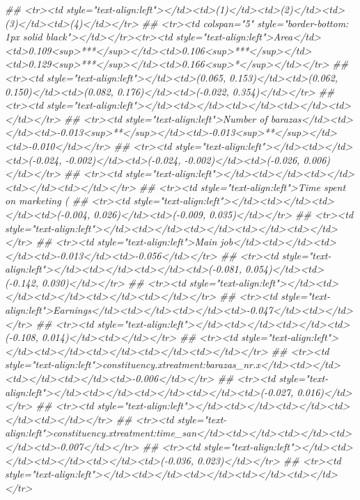\documentclass[
]{article}
\newenvironment{Shaded}{\begin{snugshade}}{\end{snugshade}}
\newcommand{\CommentTok}[1]{\textcolor[rgb]{0.56,0.35,0.01}{\textit{#1}}}
\begin{document}
\begin{Shaded}
\begin{Highlighting}[]
{{{{{{{{{{{{{{{{{\CommentTok{## <tr><td style="text-align:left"></td><td>(1)</td><td>(2)</td><td>(3)</td><td>(4)</td></tr>}
\CommentTok{## <tr><td colspan="5" style="border-bottom: 1px solid black"></td></tr><tr><td style="text-align:left">Area</td><td>0.109<sup>***</sup></td><td>0.106<sup>***</sup></td><td>0.129<sup>***</sup></td><td>0.166<sup>*</sup></td></tr>}
\CommentTok{## <tr><td style="text-align:left"></td><td>(0.065, 0.153)</td><td>(0.062, 0.150)</td><td>(0.082, 0.176)</td><td>(-0.022, 0.354)</td></tr>}
\CommentTok{## <tr><td style="text-align:left"></td><td></td><td></td><td></td><td></td></tr>}
\CommentTok{## <tr><td style="text-align:left">Number of barazas</td><td></td><td>-0.013<sup>**</sup></td><td>-0.013<sup>**</sup></td><td>-0.010</td></tr>}
\CommentTok{## <tr><td style="text-align:left"></td><td></td><td>(-0.024, -0.002)</td><td>(-0.024, -0.002)</td><td>(-0.026, 0.006)</td></tr>}
\CommentTok{## <tr><td style="text-align:left"></td><td></td><td></td><td></td><td></td></tr>}
\CommentTok{## <tr><td style="text-align:left">Time spent on marketing (%)</td><td></td><td></td><td>0.011</td><td>0.013</td></tr>}
\CommentTok{## <tr><td style="text-align:left"></td><td></td><td></td><td>(-0.004, 0.026)</td><td>(-0.009, 0.035)</td></tr>}
\CommentTok{## <tr><td style="text-align:left"></td><td></td><td></td><td></td><td></td></tr>}
\CommentTok{## <tr><td style="text-align:left">Main job</td><td></td><td></td><td>-0.013</td><td>-0.056</td></tr>}
\CommentTok{## <tr><td style="text-align:left"></td><td></td><td></td><td>(-0.081, 0.054)</td><td>(-0.142, 0.030)</td></tr>}
\CommentTok{## <tr><td style="text-align:left"></td><td></td><td></td><td></td><td></td></tr>}
\CommentTok{## <tr><td style="text-align:left">Earnings</td><td></td><td></td><td>-0.047</td><td></td></tr>}
\CommentTok{## <tr><td style="text-align:left"></td><td></td><td></td><td>(-0.108, 0.014)</td><td></td></tr>}
\CommentTok{## <tr><td style="text-align:left"></td><td></td><td></td><td></td><td></td></tr>}
\CommentTok{## <tr><td style="text-align:left">constituency.xtreatment:barazas_nr.x</td><td></td><td></td><td></td><td>-0.006</td></tr>}
\CommentTok{## <tr><td style="text-align:left"></td><td></td><td></td><td></td><td>(-0.027, 0.016)</td></tr>}
\CommentTok{## <tr><td style="text-align:left"></td><td></td><td></td><td></td><td></td></tr>}
\CommentTok{## <tr><td style="text-align:left">constituency.xtreatment:time_san</td><td></td><td></td><td></td><td>-0.007</td></tr>}
\CommentTok{## <tr><td style="text-align:left"></td><td></td><td></td><td></td><td>(-0.036, 0.023)</td></tr>}
\CommentTok{## <tr><td style="text-align:left"></td><td></td><td></td><td></td><td></td></tr>}
}}}}}}}}}}}}}}}}}}
\end{Highlighting}
\end{Shaded}
\end{document}
